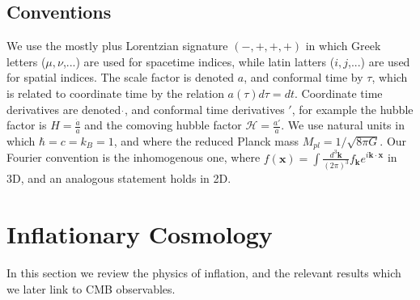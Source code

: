 \documentclass[a4paper,10pt]{article}
\renewcommand{\v}[1]{\mathbf{#1}}
\newcommand{\Mp}{M_{pl}}
\newcommand{\fint}[1]{\int \frac{d^3 \v{#1}}{(2\pi)^3}}
\begin{document}
\subsection{Conventions}

We use the mostly plus Lorentzian signature $(-,+,+,+)$ in which Greek letters ($\mu,\nu$,...) are used for spacetime indices, while latin latters ($i,j$,...) are used for spatial indices. The scale factor is denoted $a$, and conformal time by $\tau$, which is related to coordinate time by the relation $a(\tau)d\tau = dt$. Coordinate time derivatives are denoted $\dot{}$, and conformal time derivatives $'$, for example the hubble factor is $H=\frac{\dot{a}}{a}$ and the comoving hubble factor $\mathcal{H}=\frac{a'}{a}$. We use natural units in which $\hbar=c=k_B=1$, and where the reduced Planck mass $\Mp = 1/\sqrt{8\pi G}$. Our Fourier convention is the inhomogenous one, where $f(\v{x}) = \fint{k} f_\v{k}e^{i\v{k}\cdot\v{x}}$ in 3D, and an analogous statement holds in 2D.


\newpage
\section{Inflationary Cosmology}

In this section we review the physics of inflation, and the relevant results which we later link to CMB observables.
\end{document}
